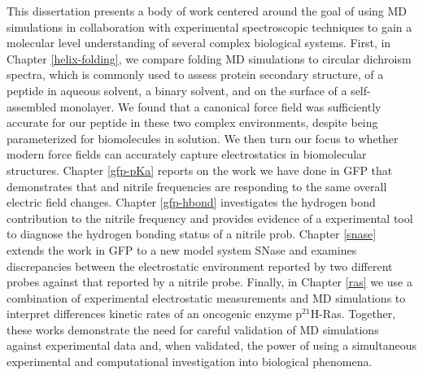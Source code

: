 This dissertation presents a body of work centered around the goal of using MD simulations in collaboration with experimental spectroscopic techniques to gain a molecular level understanding of several complex biological systems. 
First, in Chapter \ref{helix-folding}, we compare folding MD simulations to circular dichroism spectra, which is commonly used to assess protein secondary structure, of a peptide in aqueous solvent, a binary solvent, and on the surface of a self-assembled monolayer. 
We found that a canonical force field was sufficiently accurate for our peptide in these two complex environments, despite being parameterized for biomolecules in solution. 
We then turn our focus to whether modern force fields can accurately capture electrostatics in biomolecular structures. 
Chapter \ref{gfp-pKa} reports on the work we have done in GFP that demonstrates that \pKa{} and nitrile frequencies are responding to the same overall electric field changes. 
Chapter \ref{gfp-hbond} investigates the hydrogen bond contribution to the nitrile frequency and provides evidence of a experimental tool to diagnose the hydrogen bonding status of a nitrile prob. 
Chapter \ref{snase} extends the work in GFP to a new model system SNase and examines discrepancies between the electrostatic environment reported by two different \pKa{} probes against that reported by a nitrile probe. 
Finally, in Chapter \ref{ras} we use a combination of experimental electrostatic measurements and MD simulations to interpret differences kinetic rates of an oncogenic enzyme p$^{21}$H-Ras. 
Together, these works demonstrate the need for careful validation of MD simulations against experimental data and, when validated, the power of using a simultaneous experimental and computational investigation into biological phenomena.

